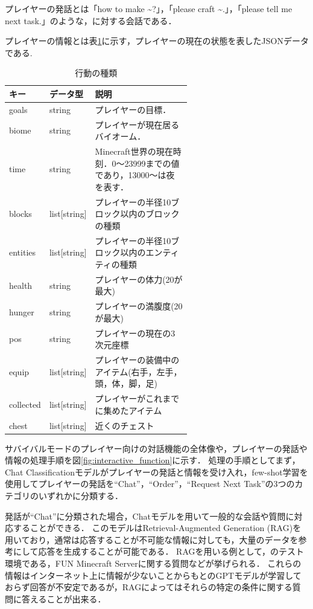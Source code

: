 プレイヤーの発話とは「how to make \textasciitilde?」，「please craft \textasciitilde.」，「please tell me next task.」のような，{\mason}に対する会話である．

プレイヤーの情報とは表\ref{tab:player_data}に示す，プレイヤーの現在の状態を表したJSONデータである.
\begin{table}[H]
    \caption{行動の種類}\label{tab:player_data}
    \centering
    \begin{tabular}{llp{0.6\linewidth}}
        \hline \hline
        キー & データ型 & 説明 \\
        \hline
        goals & string & プレイヤーの目標． \\
        biome & string & プレイヤーが現在居るバイオーム． \\
        time & string & Minecraft世界の現在時刻．0～23999までの値であり，13000～は夜を表す． \\
        blocks & list[string] & プレイヤーの半径10ブロック以内のブロックの種類 \\
        entities & list[string] & プレイヤーの半径10ブロック以内のエンティティの種類 \\
        health & string & プレイヤーの体力(20が最大) \\
        hunger & string & プレイヤーの満腹度(20が最大) \\
        pos & string & プレイヤーの現在の3次元座標 \\
        equip & list[string] & プレイヤーの装備中のアイテム(右手，左手，頭，体，脚，足) \\
        collected & list[string] & プレイヤーがこれまでに集めたアイテム \\
        chest & list[string] & 近くのチェスト \\
        \hline
    \end{tabular}
\end{table}

サバイバルモードのプレイヤー向けの対話機能の全体像や，プレイヤーの発話や情報の処理手順を図\ref{fig:interactive_function}に示す．
処理の手順としてまず，Chat Classificationモデルがプレイヤーの発話と情報を受け入れ，few-shot学習\cite{bib:few-shot}を使用してプレイヤーの発話を``Chat''，``Order''，``Request Next Task''の3つのカテゴリのいずれかに分類する．

発話が``Chat''に分類された場合，Chatモデルを用いて一般的な会話や質問に対応することができる．
このモデルはRetrieval-Augmented Generation (RAG)\cite{bib:rag}を用いており，通常は応答することが不可能な情報に対しても，大量のデータを参考にして応答を生成することが可能である．
RAGを用いる例として，{\mason}のテスト環境である，FUN Minecraft Server\cite{bib:fun_minecraft_server}に関する質問などが挙げられる．
これらの情報はインターネット上に情報が少ないことからもとのGPTモデルが学習しておらず回答が不安定であるが，RAGによって{\mason}はそれらの特定の条件に関する質問に答えることが出来る．

